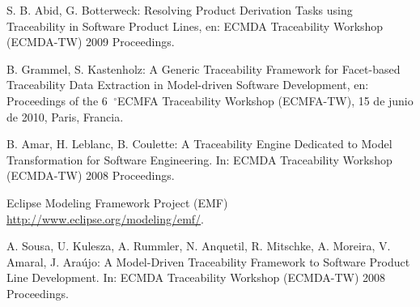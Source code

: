 \documentclass[a4paper,12pt,oneside]{book}
\newcommand{\grad}{\hspace{-2mm}$\phantom{a}^{\circ}$}
\begin{document}
\begin{thebibliography}{99}
 S. B. Abid, G. Botterweck: Resolving Product Derivation Tasks using Traceability in Software Product Lines, en: ECMDA Traceability Workshop (ECMDA-TW) 2009 Proceedings.

 B. Grammel, S. Kastenholz: A Generic Traceability Framework for Facet-based Traceability Data Extraction in Model-driven Software Development, en: Proceedings of the 6\grad ECMFA Traceability Workshop (ECMFA-TW), 15 de junio de 2010, Paris, Francia.

 B. Amar, H. Leblanc, B. Coulette: A Traceability Engine Dedicated to Model Transformation for Software Engineering. In: ECMDA Traceability Workshop (ECMDA-TW) 2008 Proceedings.

 Eclipse Modeling Framework Project (EMF) \url{http://www.eclipse.org/modeling/emf/}.

 A. Sousa, U. Kulesza, A. Rummler, N. Anquetil, R. Mitschke, A. Moreira, V. Amaral, J. Araújo: A Model-Driven Traceability Framework to Software Product Line Development. In: ECMDA Traceability Workshop (ECMDA-TW) 2008 Proceedings.

\end{thebibliography}
\end{document}
